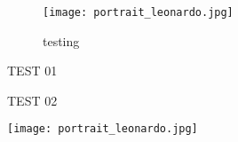 \documentclass[12pt]{article}
\begin{document}
\begin{figure}[!h]
\centering	
\texttt{[image: portrait\_leonardo.jpg]}

\caption{testing}
\end{figure}


\begin{minipage}[t]{0.4\linewidth}
	TEST 01
	\vspace{\baselineskip}
\end{minipage}
\begin{minipage}[t]{0.4\linewidth}
	\vspace{.63cm}
	TEST 02
	\hspace{\fill}
\end{minipage}
\begin{minipage}[t]{0.2\linewidth}
	\vspace{-1.4cm}
	\begin{flushright}
		\texttt{[image: portrait\_leonardo.jpg]}
	\end{flushright}
\end{minipage}
\end{document}
